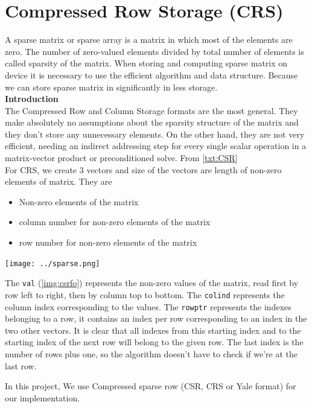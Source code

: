 \section{Compressed Row Storage (CRS)}
\label{sec:csr}
A sparse matrix or sparse array is a matrix in which most of the elements are zero. The number  of zero-valued elements divided by total number of elements is called sparsity of the matrix. When storing and computing sparse matrix on device it is necessary to use the efficient algorithm and data structure. Because we can store sparse matrix in significantly in less storage.\\
\textbf{Introduction}\\
The Compressed Row and Column Storage formats are the most general. They make absolutely no assumptions about the sparsity structure of the matrix and they don't store any unnecessary elements. On the other hand, they are not very efficient, needing an indirect addressing step for every single scalar operation in a matrix-vector product or preconditioned solve. From \ref{txt:CSR}\\
For CRS, we create 3 vectors and size of the vectors are length of non-zero elements of matrix. They are 
\begin{itemize}
	\item Non-zero elements of the matrix
	\item column number for non-zero elements of the matrix
	\item row number for non-zero elements of the matrix
\end{itemize}
\begin{center}
	\texttt{[image: ../sparse.png]} 
	\label{img:csrfo}
\end{center}


The \texttt{val}  (\ref{img:csrfo}) represents the non-zero values of the matrix, read first by row left to right, then by column top to bottom. The \texttt{colind} represents the column index corresponding to the values. The \texttt{rowptr} represents the indexes belonging to a row, it contains an index per row corresponding to an index in the two other vectors. It is clear that all indexes from this starting index and to the starting index of the next row will belong to the given row. The last index is the number of rows plus one, so the algorithm doesn’t have to check if we’re at the last row.


In this project, We use Compressed sparse row (CSR, CRS or Yale format) for our implementation.

